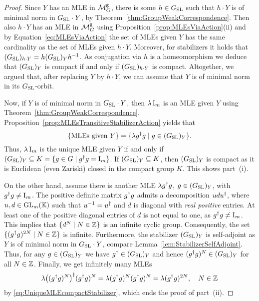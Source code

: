 \begin{proof}
	Since $Y$ has an MLE in $\mathcal{M}^{\mathtt{g}}_G$, there is some $h \in G_{\operatorname{SL}}$ such that $h \cdot Y$ is of minimal norm in $G_{\operatorname{SL}} \cdot Y$, by Theorem~\ref{thm:GroupWeakCorrespondence}. Then also $h \cdot Y$ has an MLE in $\mathcal{M}^{\mathtt{g}}_G$ using Proposition~\ref{prop:MLEsViaAction}(ii) and by Equation~\eqref{eq:MLEsViaAction} the set of MLEs given $Y$ has the same cardinality as the set of MLEs given $h \cdot Y$. Moreover, for stabilizers it holds that $(G_{\operatorname{SL}})_{h \cdot Y} = h(G_{\operatorname{SL}})_Y h^{-1}$. As conjugation via $h$ is a homeomorphism we deduce that $(G_{\operatorname{SL}})_Y$ is compact if and only if $(G_{\operatorname{SL}})_{h \cdot Y}$ is compact. Altogether, we argued that, after replacing $Y$ by $h \cdot Y$, we can assume that $Y$ is of minimal norm in its $G_{\operatorname{SL}}$-orbit.
	
	Now, if $Y$ is of minimal norm in $G_{\operatorname{SL}} \cdot Y$, then $\lambda \operatorname{I}_m$ is an MLE given $Y$ using Theorem~\ref{thm:GroupWeakCorrespondence}.  Proposition~\ref{prop:MLEsTransitiveStabilizerAction} yields that
		\begin{equation}\label{eq:UniqueMLEcompactStabilizer}
			\{ \text{MLEs given } Y\} = \{\lambda g^{\dagger} g \mid g \in (G_{\operatorname{SL}})_Y\}.
		\end{equation}
	Thus, $\lambda \operatorname{I}_m$ is the unique MLE given $Y$ if and only if $(G_{\operatorname{SL}})_Y \subseteq K = \{g \in G \mid g^{\dagger} g = \operatorname{I}_m\}$. 
	If $(G_{\operatorname{SL}})_Y \subseteq K$, then $(G_{\operatorname{SL}})_Y$ is compact as it is Euclidean (even Zariski) closed in the compact group $K$. This shows part~(i).
	
	On the other hand, assume there is another MLE $\lambda g^{\dagger} g$, $g \in (G_{\operatorname{SL}})_Y$, with $g^{\dagger} g \neq \operatorname{I}_m$. The positive definite matrix $g^{\dagger} g$ admits a decomposition $udu^{\dagger}$, where $u,d \in \operatorname{GL}_m(\mathbb K)$ such that $u^{-1} = u^{\dagger}$ and $d$ is diagonal with \emph{real positive} entries. At least one of the positive diagonal entries of $d$ is not equal to one, as $g^{\dagger} g \neq \operatorname{I}_m$. This implies that $\{d^N \mid N \in \mathbb Z\}$ is an infinite cyclic group. Consequently, the set $\{ (g^{\dagger} g)^{2N} \mid N \in \mathbb Z \}$ is infinite. Furthermore, the stabilizer $(G_{\operatorname{SL}})_Y$ is self-adjoint as $Y$ is of minimal norm in $G_{\operatorname{SL}} \cdot Y$, compare Lemma~\ref{lem:StabilizerSelfAdjoint}. Thus, for any $g \in (G_{\operatorname{SL}})_Y$ we have $g^{\dagger} \in (G_{\operatorname{SL}})_Y$ and hence $( g^{\dagger} g )^N \in (G_{\operatorname{SL}})_Y$ for all $N \in \mathbb Z$. Finally, we get infinitely many MLEs 
		\[ \lambda \big( (g ^{\dagger} g)^N \big)^{\dagger}  (g ^{\dagger} g)^N = \lambda (g ^{\dagger} g)^N (g ^{\dagger} g)^N = \lambda (g ^{\dagger} g)^{2N}, \quad N \in \mathbb Z\]
	by \eqref{eq:UniqueMLEcompactStabilizer}, which ends the proof of part~(ii).
\end{proof}

